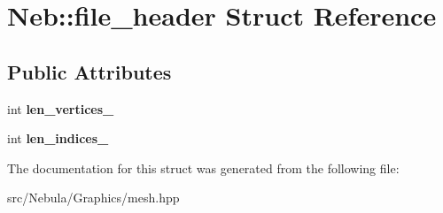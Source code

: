 \hypertarget{structNeb_1_1file__header}{\section{\-Neb\-:\-:file\-\_\-header \-Struct \-Reference}
\label{structNeb_1_1file__header}
}
\subsection*{\-Public \-Attributes}
\begin{DoxyCompactItemize}
\item 
\hypertarget{structNeb_1_1file__header_aeb806255496ccbd26327a962d308a314}{int {\bfseries len\-\_\-vertices\-\_\-}}\label{structNeb_1_1file__header_aeb806255496ccbd26327a962d308a314}

\item 
\hypertarget{structNeb_1_1file__header_ac7e0c2f819a800e70c6d24a04f99b884}{int {\bfseries len\-\_\-indices\-\_\-}}\label{structNeb_1_1file__header_ac7e0c2f819a800e70c6d24a04f99b884}

\end{DoxyCompactItemize}


\-The documentation for this struct was generated from the following file\-:\begin{DoxyCompactItemize}
\item 
src/\-Nebula/\-Graphics/mesh.\-hpp\end{DoxyCompactItemize}
